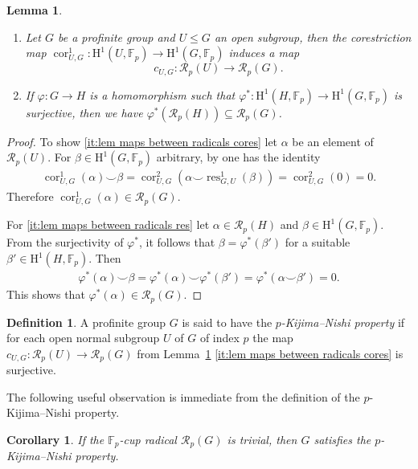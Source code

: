 \documentclass{amsart}
\newtheorem{cor}[thm]{Corollary}
\newtheorem{lem}[thm]{Lemma}
\theoremstyle{definition}
\newtheorem{defn}[thm]{Definition}
\theoremstyle{remark}
\DeclareMathOperator{\res}{res}
\DeclareMathOperator{\cores}{cor}
\newcommand{\FF}{\mathbb{F}}
\newcommand{\calR}{\mathcal{R}}
\newcommand{\rmH}{\mathrm H}%
\begin{document}
\begin{lem}\label{lem:maps between radicals}
\begin{enumerate}[label=(\arabic*)]
    \item \label{it:lem maps between radicals cores} Let $G$ be a profinite group and $U\leq G$ an open subgroup, then the corestriction map $\cores_{U,G}^1:\rmH^1(U,\FF_p)\to \rmH^1(G,\FF_p)$ induces a map 
    $$c_{U,G}:\mathcal{\calR}_p(U)\longrightarrow \mathcal{\calR}_p(G).$$
    \item \label{it:lem maps between radicals res} If $\varphi:G\to H$ is a homomorphism such that $\varphi^*:\rmH^1(H,\FF_p)\to \rmH^1(G,\FF_p)$ is surjective, then we have $\varphi^*(\calR_p(H))\subseteq \calR_p(G)$.
\end{enumerate}
    

   
\end{lem}
\begin{proof}
To show \ref{it:lem maps between radicals cores} let $\alpha$ be an element of $\calR_p(U)$. For $\beta\in \rmH^1(G,\FF_p)$ arbitrary, by \cite[Prop.~1.5.3]{NSW2008} one has the identity
\begin{align*}
    \cores_{U,G}^1(\alpha)\smallsmile\beta=\cores^{2}_{U,G}(\alpha\smallsmile \res_{G,U}^1(\beta))=\cores^2_{U,G}(0)=0.
\end{align*}
Therefore $\cores^1_{U,G}(\alpha)\in \calR_p(G)$.

For \ref{it:lem maps between radicals res} let $\alpha\in \calR_p(H)$ and $\beta\in \rmH^1(G,\FF_p)$. From the surjectivity of $\varphi^*$, it follows that $\beta=\varphi^*(\beta')$ for a suitable $\beta'\in \rmH^1(H,\FF_p)$. Then 
\begin{align*}
    \varphi^*(\alpha)\smallsmile \beta=\varphi^*(\alpha)\smallsmile \varphi^*(\beta')=\varphi^*(\alpha\smallsmile \beta')=0.
\end{align*}
This shows that $\varphi^*(\alpha)\in \calR_p(G)$.
\end{proof}
\begin{defn}
    \label{defin:pKN}
    A profinite group $G$ is said to have the \emph{$p$-Kijima--Nishi property} if for each open normal subgroup $U$ of $G$ of index $p$ the map $c_{U,G}:\calR_p(U)\to\calR_p(G)$ from Lemma~\ref{lem:maps between radicals} \ref{it:lem maps between radicals cores} is surjective.
\end{defn}
The following useful observation is immediate from the definition of the $p$-Kijima--Nishi property.
\begin{cor}\label{cor:trivial R}
If the $\FF_p$-cup radical $\calR_p(G)$ is trivial, then $G$ satisfies the $p$-Kijima--Nishi property.
\end{cor}
\end{document}
